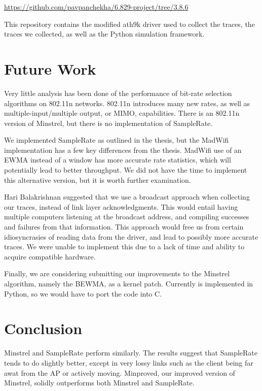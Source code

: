 \documentclass[twocolumn,10pt]{article}
\begin{document}
\noindent
{\small\url{https://github.com/pavpanchekha/6.829-project/tree/3.8.6}}

This repository contains the modified ath9k driver used to collect the
traces, the traces we collected, as well as the Python simulation
framework.

\section{Future Work}

Very little analysis has been done of the performance of bit-rate
selection algorithms on 802.11n networks.  802.11n introduces many new
rates, as well as multiple-input/multiple output, or MIMO,
capabilities.  There is an 802.11n version of Minstrel, but there is no
implementation of SampleRate.

We implemented SampleRate as outlined in the thesis, but the MadWifi
implementation has a few key differences from the thesis. MadWifi 
use of an EWMA instead of a window has more accurate
rate statistics, which will potentially lead to better throughput. We
did not have the time to implement this alternative version, but it is
worth further examination.

Hari Balakrishnan suggested that we use a broadcast approach when
collecting our traces, instead of link layer acknowledgments.  This
would entail having multiple computers listening at the broadcast
address, and compiling successes and failures from that information.
This approach would free us from certain idiosyncrasies of reading
data from the driver, and lead to possibly more accurate traces.  We
were unable to implement this due to a lack of time and ability to
acquire compatible hardware.

Finally, we are considering submitting our improvements to the
Minstrel algorithm, namely the BEWMA, as a kernel patch.  Currently is
implemented in Python, so we would have to port the code into C.

\section{Conclusion}

Minstrel and SampleRate perform similarly.  The results suggest that
SampleRate tends to do slightly better, except in very lossy links
such as the client being far awat from the AP or actively moving.
Minproved, our improved version of Minstrel, solidly outperforms both
Minstrel and SampleRate.
\end{document}
